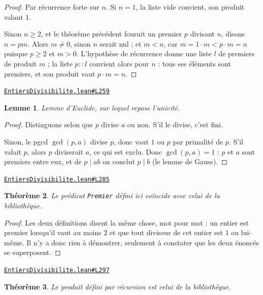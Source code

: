\documentclass[11pt,a4paper]{article}
\theoremstyle{definition}
\theoremstyle{plain}
\newtheorem{theoreme}{Théorème}
\newtheorem{lemme}[theoreme]{Lemme}
\newcommand{\source}[2]{\par\smallskip\noindent\hfill{\footnotesize\href{#1}{\texttt{#2}}}\par\smallskip}
\begin{document}
\begin{proof}
Par récurrence forte sur $n$. Si $n = 1$, la liste vide convient, son produit valant $1$.

Sinon $n \ge 2$, et le théorème précédent fournit un premier $p$ divisant $n$, disons
$n = pm$. Alors $m \ne 0$, sinon $n$ serait nul ; et $m < n$, car
$m = 1 \cdot m < p \cdot m = n$ puisque $p \ge 2$ et $m > 0$. L'hypothèse de récurrence
donne une liste $l$ de premiers de produit $m$ ; la liste $p :: l$ convient alors pour
$n$ : tous ses éléments sont premiers, et son produit vaut $p \cdot m = n$.
\end{proof}
\source{https://github.com/Commutator-IO/learn-lean/blob/main/courses/01-college/01-nombres-et-calculs/EntiersDivisibilite.lean\#L259}{EntiersDivisibilite.lean\#L259}

\begin{lemme}
Lemme d'Euclide, sur lequel repose l'unicité.
\end{lemme}

\begin{proof}
Distinguons selon que $p$ divise $a$ ou non. S'il le divise, c'est fini.

Sinon, le pgcd $\gcd(p, a)$ divise $p$, donc vaut $1$ ou $p$ par primalité de $p$. S'il
valait $p$, alors $p$ diviserait $a$, ce qui est exclu. Donc $\gcd(p,a) = 1$ : $p$ et $a$
sont premiers entre eux, et de $p \mid ab$ on conclut $p \mid b$
(le lemme de Gauss).
\end{proof}
\source{https://github.com/Commutator-IO/learn-lean/blob/main/courses/01-college/01-nombres-et-calculs/EntiersDivisibilite.lean\#L285}{EntiersDivisibilite.lean\#L285}

\begin{theoreme}
Le prédicat \texttt{Premier} défini ici coïncide avec celui de la bibliothèque.
\end{theoreme}

\begin{proof}
Les deux définitions disent la même chose, mot pour mot : un entier est premier lorsqu'il
vaut au moins $2$ et que tout diviseur de cet entier est $1$ ou lui-même. Il n'y a donc
rien à démontrer, seulement à constater que les deux énoncés se superposent.
\end{proof}
\source{https://github.com/Commutator-IO/learn-lean/blob/main/courses/01-college/01-nombres-et-calculs/EntiersDivisibilite.lean\#L297}{EntiersDivisibilite.lean\#L297}

\begin{theoreme}
Le produit défini par récursion est celui de la bibliothèque.
\end{theoreme}
\end{document}
